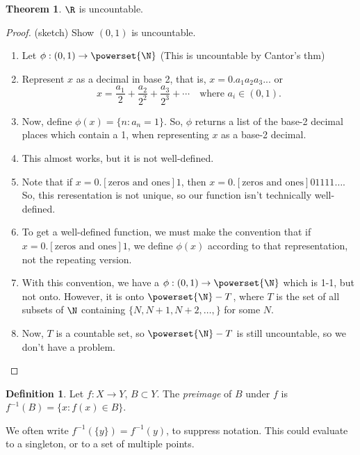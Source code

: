 \documentclass[a5paper]{article}
\theoremstyle{definition}%
\newtheorem*{theorem*}{Theorem} %
\newtheorem*{definition*}{Definition}
\numberwithin{exercise}{section}
\theoremstyle{remark}%
\begin{document}
\begin{theorem*}
$\R$ is uncountable.

\begin{proof}(sketch)
Show $(0,1)$ is uncountable. 

\begin{enumerate}
\item Let $\phi: (0,1) \to \powerset{\N}$ (This is uncountable by Cantor's thm)

\item Represent $x$ as a decimal in base 2, that is, $x=0.a_1a_2a_3...$ or 
$$x=\frac{a_1}{2}+\frac{a_2}{2^2}+\frac{a_3}{2^3}+\cdots \quad \text{where }a_i \in (0,1).$$ 

\item Now, define $\phi(x) = \{n:a_n=1\}$. So, $\phi$ returns a list of the base-2 decimal places which contain a 1, when representing $x$ as a base-2 decimal.

\item This almost works, but it is not well-defined.

\item Note that if $x=0.[\text{zeros and ones}]1$, then $x=0.[\text{zeros and ones}]01111\ldots$. So, this reresentation is not unique, so our function isn't technically well-defined. 

\item To get a well-defined function, we must make the convention that if $x=0.[\text{zeros and ones}]1$, we define $\phi(x)$ according to that representation, not the repeating version. 

\item With this convention, we have a $\phi: (0,1) \to \powerset{\N}$ which is 1-1, but not onto. However, it is onto $\powerset{\N}-T$, where $T$ is the set of all subsets of $\N$ containing $\{N, N+1, N+2, \ldots, \}$ for some $N$. 

\item Now, $T$ is a countable set, so $\powerset{\N}-T$ is still uncountable, so we don't have a problem. 
\end{enumerate}
\end{proof}
\end{theorem*}

\begin{definition*}
Let $f:X \to Y$, $B \subset	 Y$. The \emph{preimage} of $B$ under $f$ is $f^{-1}(B)=\{x:f(x)\in B\}$.

We often write $f^{-1}(\{y\})=f^{-1}(y)$, to suppress notation. This could evaluate to a singleton, or to a set of multiple points. 
\end{definition*}
\end{document}
